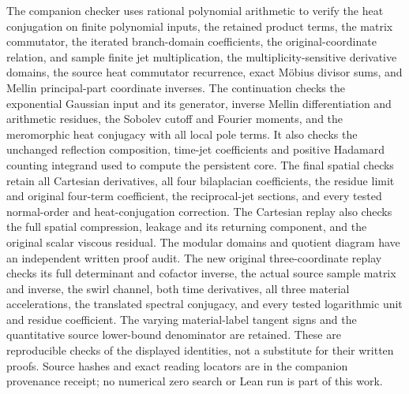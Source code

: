 The companion checker uses rational polynomial arithmetic to verify
the heat conjugation on finite polynomial inputs, the retained
product terms, the matrix commutator, the iterated branch-domain
coefficients, the original-coordinate relation, and sample finite
jet multiplication, the multiplicity-sensitive derivative domains,
the source heat commutator recurrence, exact M\"obius divisor sums,
and Mellin principal-part coordinate inverses.
The continuation checks the exponential Gaussian input and its
generator, inverse Mellin differentiation and arithmetic residues,
the Sobolev cutoff and Fourier moments, and the meromorphic
heat conjugacy with all local pole terms.
It also checks the unchanged reflection composition, time-jet
coefficients and positive Hadamard counting integrand used to
compute the persistent core.
The final spatial checks retain all Cartesian derivatives,
all four bilaplacian coefficients, the residue limit and
original four-term coefficient, the reciprocal-jet sections,
and every tested normal-order and heat-conjugation correction.
The Cartesian replay also checks the full spatial compression,
leakage and its returning component, and the original scalar
viscous residual. The modular domains and quotient diagram have
an independent written proof audit.
The new original three-coordinate replay checks its full
determinant and cofactor inverse, the actual source sample
matrix and inverse, the swirl channel, both time derivatives,
all three material accelerations, the translated spectral
conjugacy, and every tested logarithmic unit and residue
coefficient. The varying material-label tangent signs and
the quantitative source lower-bound denominator are retained.
These are reproducible checks of the displayed
identities, not a substitute for their written proofs. Source
hashes and exact reading locators are in the companion provenance
receipt; no numerical zero search or Lean run is part of this work.
